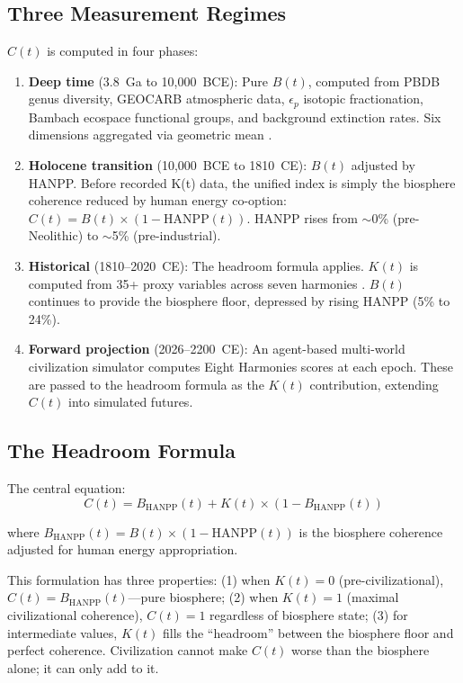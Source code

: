 \documentclass[10pt,letterpaper]{article}
\newcommand{\bt}{$B(t)$}
\newcommand{\kt}{$K(t)$}
\newcommand{\ct}{$C(t)$}
\begin{document}
\subsection*{Three Measurement Regimes}

\ct{} is computed in four phases:

\begin{enumerate}
\item \textbf{Deep time} (3.8~Ga to 10,000~BCE): Pure \bt{}, computed
from PBDB genus diversity, GEOCARB atmospheric data, $\epsilon_p$
isotopic fractionation, Bambach ecospace functional groups, and
background extinction rates. Six dimensions aggregated via geometric
mean \cite{stoltz2026bt}.

\item \textbf{Holocene transition} (10,000~BCE to 1810~CE): \bt{}
adjusted by HANPP. Before recorded K(t) data, the unified index is
simply the biosphere coherence reduced by human energy co-option:
$C(t) = B(t) \times (1 - \text{HANPP}(t))$. HANPP rises from
$\sim$0\% (pre-Neolithic) to $\sim$5\% (pre-industrial).

\item \textbf{Historical} (1810--2020~CE): The headroom formula applies.
\kt{} is computed from 35+ proxy variables across seven harmonies
\cite{stoltz2026kt}. \bt{} continues to provide the biosphere floor,
depressed by rising HANPP (5\% to 24\%).

\item \textbf{Forward projection} (2026--2200~CE): An agent-based
multi-world civilization simulator \cite{stoltz2026sim} computes
Eight Harmonies scores at each epoch. These are passed to the headroom
formula as the $K(t)$ contribution, extending \ct{} into simulated futures.
\end{enumerate}

\subsection*{The Headroom Formula}

The central equation:
\begin{equation}
C(t) = B_{\text{HANPP}}(t) + K(t) \times (1 - B_{\text{HANPP}}(t))
\end{equation}

where $B_{\text{HANPP}}(t) = B(t) \times (1 - \text{HANPP}(t))$ is the
biosphere coherence adjusted for human energy appropriation.

This formulation has three properties: (1) when $K(t) = 0$
(pre-civilizational), $C(t) = B_{\text{HANPP}}(t)$---pure biosphere;
(2) when $K(t) = 1$ (maximal civilizational coherence), $C(t) = 1$
regardless of biosphere state; (3) for intermediate values, $K(t)$
fills the ``headroom'' between the biosphere floor and perfect coherence.
Civilization cannot make \ct{} worse than the biosphere alone; it can
only add to it.
\end{document}
